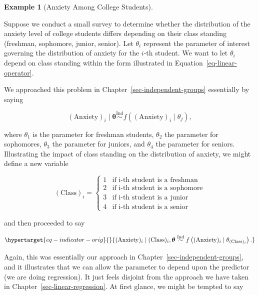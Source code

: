 \documentclass[
  letterpaper,
  DIV=11,
  numbers=noendperiod]{scrreprt}
\theoremstyle{definition}
\theoremstyle{plain}
\theoremstyle{definition}
\newtheorem{example}{Example}[chapter]
\theoremstyle{remark}
\begin{document}
\begin{example}[Anxiety Among College
Students]\protect\hypertarget{exm-anxiety}{}\label{exm-anxiety}

Suppose we conduct a small survey to determine whether the distribution
of the anxiety level of college students differs depending on their
class standing (freshman, sophomore, junior, senior). Let \(\theta_i\)
represent the parameter of interest governing the distribution of
anxiety for the \(i\)-th student. We want to let \(\theta_i\) depend on
class standing within the form illustrated in
Equation~\ref{eq-linear-operator}.

\end{example}

We approached this problem in Chapter~\ref{sec-independent-groups}
essentially by saying

\[(\text{Anxiety})_i \mid \boldsymbol{\theta} \stackrel{\text{Ind}}{\sim}f\left((\text{Anxiety})_i \mid \theta_j\right),\]

where \(\theta_1\) is the parameter for freshman students, \(\theta_2\)
the parameter for sophomores, \(\theta_3\) the parameter for juniors,
and \(\theta_4\) the parameter for seniors. Illustrating the impact of
class standing on the distribution of anxiety, we might define a new
variable

\[(\text{Class})_i = \begin{cases}
1 & \text{if i-th student is a freshman} \\
2 & \text{if i-th student is a sophomore} \\
3 & \text{if i-th student is a junior} \\
4 & \text{if i-th student is a senior} \end{cases}\]

and then proceeded to say

\begin{equation}\protect\hypertarget{eq-indicator-orig}{}{(\text{Anxiety})_i \mid (\text{Class})_i, \boldsymbol{\theta} \stackrel{\text{Ind}}{\sim}f\left((\text{Anxiety})_i \mid \theta_{(\text{Class})_i}\right).}\label{eq-indicator-orig}\end{equation}

Again, this was essentially our approach in
Chapter~\ref{sec-independent-groups}, and it illustrates that we can
allow the parameter to depend upon the predictor (we are doing
regression). It just feels disjoint from the approach we have taken in
Chapter~\ref{sec-linear-regression}. At first glance, we might be
tempted to say
\end{document}
